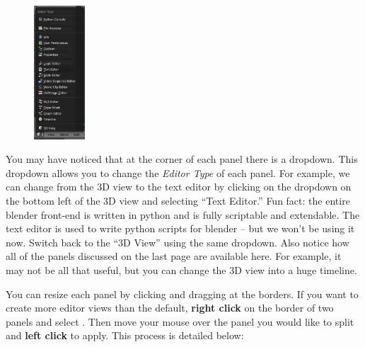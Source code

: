\documentclass[11pt]{article}
\begin{document}
\begin{figure}
    \vspace*{-2em}
    \includegraphics[width=0.17\textwidth]{editor-type-dropdown}
\end{figure}
You may have noticed that at the corner of each panel there is a dropdown.  This dropdown allows
you to change the \textit{Editor Type} of each panel.  For example, we can change from the 3D view 
to the text editor by clicking on the dropdown on the bottom left of the 3D view and selecting ``Text 
Editor.''  Fun fact: the entire blender front-end is written in python and is fully scriptable and
extendable.  The text editor is used to write python scripts for blender -- but we won't be using it
now.  Switch back to the ``3D View'' using the same dropdown.  Also notice how all of the panels
discussed on the last page are available here.  For example, it may not be all that useful, but you 
can change the 3D view into a huge timeline.

You can resize each panel by clicking and dragging at the borders.  If you want to create more editor
views than the default, \textbf{right click} on the border of two panels and select .
Then move your mouse over the panel you would like to split and \textbf{left click} to apply.  This
process is detailed below:
\end{document}
